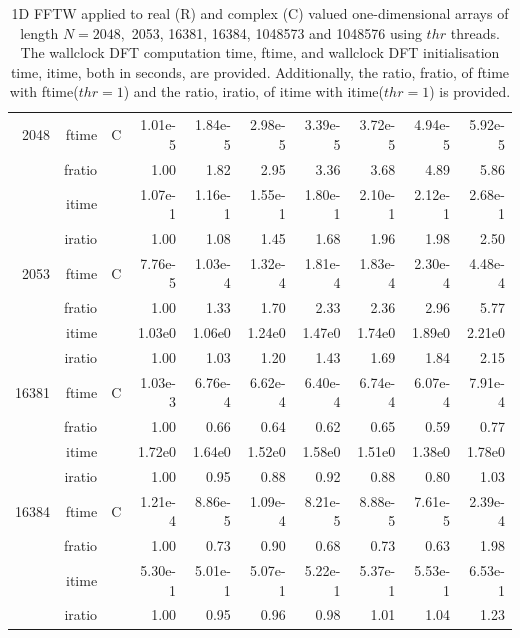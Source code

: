 \documentclass[a4paper]{article}
\begin{document}
\begin{table}[!htbp]
\begin{center}
\begin{small}
\begin{tabular}{|r|r|r|r|r|r|r|r|r|r|}
    2048  & ftime & C  &  1.01e-5 &   1.84e-5 &   2.98e-5 &   3.39e-5 &   3.72e-5 &   4.94e-5 &   5.92e-5   \\ 
      & fratio & &  1.00 &   1.82 &   2.95 &   3.36 &   3.68 &   4.89 &   5.86  \\ 
     & itime & &   1.07e-1 &   1.16e-1 &   1.55e-1 &   1.80e-1 &   2.10e-1 &   2.12e-1 &   2.68e-1   \\ 
     & iratio & &  1.00 &   1.08 &   1.45 &   1.68 &   1.96 &   1.98 &   2.50     \\ \hline 
    2053  & ftime & C &  7.76e-5 &   1.03e-4 &   1.32e-4 &   1.81e-4 &   1.83e-4 &   2.30e-4 &   4.48e-4     \\ 
      & fratio & &  1.00 &   1.33 &   1.70 &   2.33 &   2.36 &   2.96 &   5.77   \\ 
     & itime &  &  1.03e0 &   1.06e0 &   1.24e0 &   1.47e0 &   1.74e0 &   1.89e0 &   2.21e0    \\ 
    & iratio &  &  1.00 &   1.03 &   1.20 &   1.43 &   1.69 &   1.84 &   2.15       \\ \hline
  16381  & ftime & C &   1.03e-3 &   6.76e-4 &   6.62e-4 &   6.40e-4 &   6.74e-4 &   6.07e-4 &   7.91e-4     \\ 
      & fratio & &  1.00 &   0.66 &  0.64 &   0.62 &  0.65 &   0.59 &  0.77   \\ 
     & itime & &   1.72e0 &   1.64e0 &   1.52e0 &   1.58e0 &   1.51e0 &   1.38e0 &   1.78e0    \\ 
     & iratio & &   1.00 &   0.95 &  0.88 &  0.92 &  0.88 &  0.80 &  1.03    \\ \hline
 16384  & ftime & C &  1.21e-4 &   8.86e-5 &   1.09e-4 &   8.21e-5 &   8.88e-5 &   7.61e-5 &   2.39e-4  \\ 
      & fratio & & 1.00 &   0.73 &  0.90 &  0.68 &  0.73 &  0.63 &  1.98  \\
     & itime & &  5.30e-1 &   5.01e-1 &   5.07e-1 &   5.22e-1 &   5.37e-1 &   5.53e-1 &   6.53e-1   \\ 
 & iratio & &  1.00 &   0.95 &  0.96 &  0.98 &  1.01 &   1.04 &   1.23  \\  \hline 
\end{tabular}
\caption{1D FFTW applied to real (R) and complex (C) valued one-dimensional arrays of length $N=2048,$ 2053, 16381, 16384, 1048573 and 1048576 using $thr$ threads. The wallclock DFT computation time, ftime, and wallclock DFT initialisation time, itime, both in seconds, are provided. Additionally,  the ratio, fratio, of ftime  with ftime($thr=1$) and the ratio, iratio, of itime  with itime($thr=1$) is provided. }\label{Tbl:FFTW1d}
\end{small}
\end{center}
\end{table}
\end{document}
